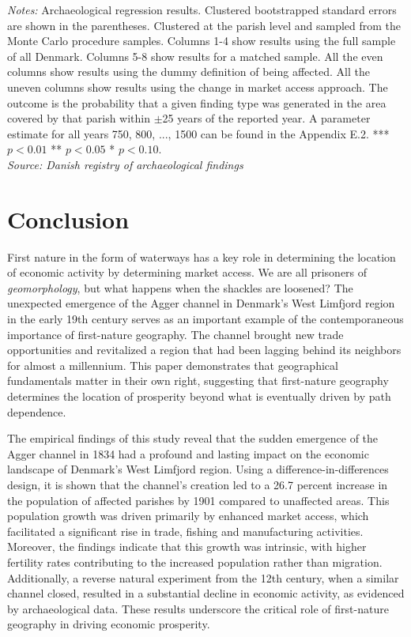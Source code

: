 \documentclass[11pt]{article}
\begin{document}
\begin{landscape}
\begin{table}
{\caption*{\footnotesize \textit{Notes:} Archaeological regression results. Clustered bootstrapped standard errors are shown in the parentheses. Clustered at the parish level and sampled from the Monte Carlo procedure samples. Columns 1-4 show results using the full sample of all Denmark. Columns 5-8 show results for a matched sample. All the even columns show results using the dummy definition of being affected. All the uneven columns show results using the change in market access approach. The outcome is the probability that a given finding type was generated in the area covered by that parish within $\pm$25 years of the reported year. A parameter estimate for all years 750, 800, ..., 1500 can be found in the Appendix E.2. *** $p< 0.01$ ** $p< 0.05$ * $p< 0.10$. \\ \textit{Source: Danish registry of archaeological findings}}
}
\end{table}
\end{landscape}

\FloatBarrier
\section{Conclusion}
First nature in the form of waterways has a key role in determining the location of economic activity by determining market access. We are all prisoners of \textit{geomorphology}, but what happens when the shackles are loosened? The unexpected emergence of the Agger channel in Denmark's West Limfjord region in the early 19th century serves as an important example of the contemporaneous importance of first-nature geography. The channel brought new trade opportunities and revitalized a region that had been lagging behind its neighbors for almost a millennium. This paper demonstrates that geographical fundamentals matter in their own right, suggesting that first-nature geography determines the location of prosperity beyond what is eventually driven by path dependence.

The empirical findings of this study reveal that the sudden emergence of the Agger channel in 1834 had a profound and lasting impact on the economic landscape of Denmark's West Limfjord region. Using a difference-in-differences design, it is shown that the channel's creation led to a 26.7 percent increase in the population of affected parishes by 1901 compared to unaffected areas. This population growth was driven primarily by enhanced market access, which facilitated a significant rise in trade, fishing and manufacturing activities. Moreover, the findings indicate that this growth was intrinsic, with higher fertility rates contributing to the increased population rather than migration. Additionally, a reverse natural experiment from the 12th century, when a similar channel closed, resulted in a substantial decline in economic activity, as evidenced by archaeological data. These results underscore the critical role of first-nature geography in driving economic prosperity.
\end{document}
